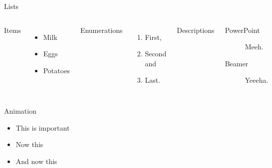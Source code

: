 \begin{frame}{Lists}
    \begin{columns}[T,onlytextwidth]
            Items
            \begin{itemize}
                \item Milk \item Eggs \item Potatoes
            \end{itemize}

            Enumerations
            \begin{enumerate}
                \item First, \item Second and \item Last.
            \end{enumerate}

            Descriptions
            \begin{description}
                \item[PowerPoint] Meeh. \item[Beamer] Yeeeha.
            \end{description}
    \end{columns}
\end{frame}
\begin{frame}{Animation}
    \begin{itemize}[<+- | alert@+>]
        \item \alert<4>{This is important}
        \item Now this
        \item And now this
    \end{itemize}
\end{frame}
